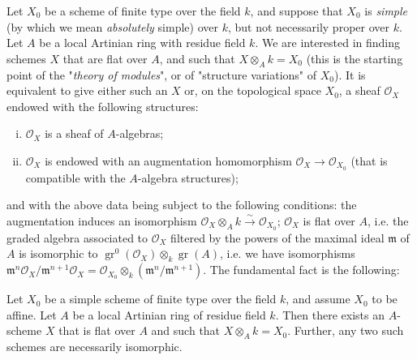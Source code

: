 Let $X_0$ be a scheme of finite type over the field $k$, and suppose that $X_0$ is \emph{simple} (by which we mean \emph{absolutely} simple) over $k$, but not necessarily proper over $k$.
Let $A$ be a local Artinian ring with residue field $k$.
We are interested in finding schemes $X$ that are flat over $A$, and such that $X\otimes_A k=X_0$ (this is the starting point of the "\emph{theory of modules}", or of "structure variations" of $X_0$).
It is equivalent to give either such an $X$ or, on the topological space $X_0$, a sheaf $\mathcal{O}_X$ endowed with the following structures:

\begin{enumerate}[i.]
    \item $\mathcal{O}_X$ is a sheaf of $A$-algebras;
    \item $\mathcal{O}_X$ is endowed with an augmentation homomorphism $\mathcal{O}_X\to\mathcal{O}_{X_0}$ (that is compatible with the $A$-algebra structures);
\end{enumerate}


and with the above data being subject to the following conditions: the augmentation induces an isomorphism $\mathcal{O}_X\otimes_A k\xrightarrow{\sim}\mathcal{O}_{X_0}$;
$\mathcal{O}_X$ is flat over $A$, i.e. the graded algebra associated to $\mathcal{O}_X$ filtered by the powers of the maximal ideal $\mathfrak{m}$ of $A$ is isomorphic to $\operatorname{gr}^0(\mathcal{O}_X)\otimes_k\operatorname{gr}(A)$, i.e. we have isomorphisms $\mathfrak{m}^n\mathcal{O}_X/\mathfrak{m}^{n+1}\mathcal{O}_X = \mathcal{O}_{X_0}\otimes_k(\mathfrak{m}^n/\mathfrak{m}^{n+1})$.
The fundamental fact is the following:

\begin{theorem}\label{fga2-theorem-8}
    Let $X_0$ be a simple scheme of finite type over the field $k$, and assume $X_0$ to be affine.
    Let $A$ be a local Artinian ring of residue field $k$.
    Then there exists an $A$-scheme $X$ that is flat over $A$ and such that $X\otimes_A k=X_0$.
    Further, any two such schemes are necessarily isomorphic.
\end{theorem}


